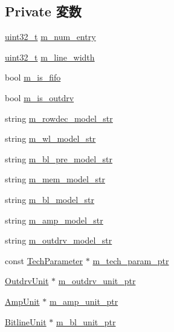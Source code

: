 \subsection*{Private 変数}
\begin{DoxyCompactItemize}
\item 
\hyperlink{Type_8hh_a435d1572bf3f880d55459d9805097f62}{uint32\_\-t} \hyperlink{classSRAM_a291c35e9632031ebe307862c5c760519}{m\_\-num\_\-entry}
\item 
\hyperlink{Type_8hh_a435d1572bf3f880d55459d9805097f62}{uint32\_\-t} \hyperlink{classSRAM_add4c54b54475120d0e1547d3a9c48f44}{m\_\-line\_\-width}
\item 
bool \hyperlink{classSRAM_a6278bce84ca8f1587dbb706ad2d20012}{m\_\-is\_\-fifo}
\item 
bool \hyperlink{classSRAM_abf268b469077bf0460d0043b68443b6a}{m\_\-is\_\-outdrv}
\item 
string \hyperlink{classSRAM_a8c06cdb977d003e4002bcfb41e08cf07}{m\_\-rowdec\_\-model\_\-str}
\item 
string \hyperlink{classSRAM_ac4e3f087da06ff2021c091e3801d43d1}{m\_\-wl\_\-model\_\-str}
\item 
string \hyperlink{classSRAM_ad05f5b41e577bbebf3a1cad993940983}{m\_\-bl\_\-pre\_\-model\_\-str}
\item 
string \hyperlink{classSRAM_a95866e527392174ec4db91c75a1792f9}{m\_\-mem\_\-model\_\-str}
\item 
string \hyperlink{classSRAM_afb4f7a38ccbd67bd5279fb192bb51187}{m\_\-bl\_\-model\_\-str}
\item 
string \hyperlink{classSRAM_a8f2d65a26d51d3c2f8b9ba7527e5fb83}{m\_\-amp\_\-model\_\-str}
\item 
string \hyperlink{classSRAM_a795b1240cc7fd86676c293dadd7617f9}{m\_\-outdrv\_\-model\_\-str}
\item 
const \hyperlink{classTechParameter}{TechParameter} $\ast$ \hyperlink{classSRAM_a11d1644aa2bfe0e16783dface6fadf13}{m\_\-tech\_\-param\_\-ptr}
\item 
\hyperlink{classOutdrvUnit}{OutdrvUnit} $\ast$ \hyperlink{classSRAM_ae68c0641bad3a869a51391378bd4e7b9}{m\_\-outdrv\_\-unit\_\-ptr}
\item 
\hyperlink{classAmpUnit}{AmpUnit} $\ast$ \hyperlink{classSRAM_a782cdf3f8bfe374a54a57282e4e9f21d}{m\_\-amp\_\-unit\_\-ptr}
\item 
\hyperlink{classBitlineUnit}{BitlineUnit} $\ast$ \hyperlink{classSRAM_a6114e5cc948c4e37dd24fe594a2e9e00}{m\_\-bl\_\-unit\_\-ptr}
\item 

\end{DoxyCompactItemize}
